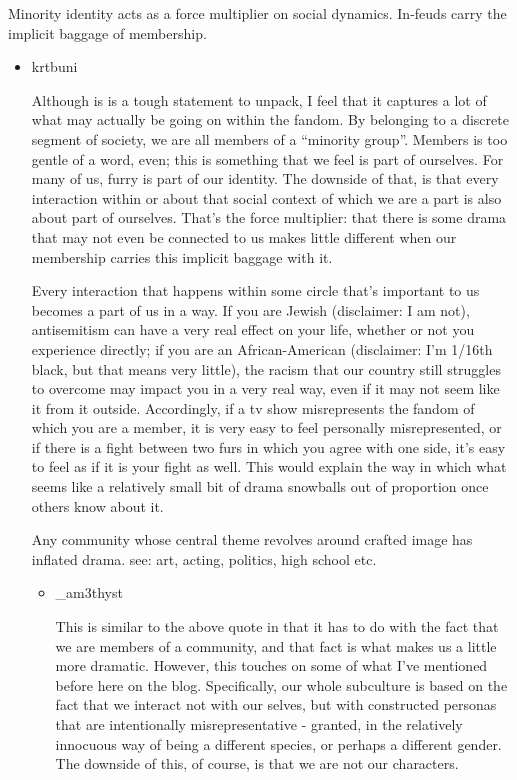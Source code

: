 Minority identity acts as a force multiplier on social dynamics. In-feuds carry the implicit baggage of membership.

\begin{itemize}
\tightlist
\item
  krtbuni

  Although is is a tough statement to unpack, I feel that it captures a lot of what may actually be going on within the fandom. By belonging to a discrete segment of society, we are all members of a ``minority group''. Members is too gentle of a word, even; this is something that we feel is part of ourselves. For many of us, furry is part of our identity. The downside of that, is that every interaction within or about that social context of which we are a part is also about part of ourselves. That's the force multiplier: that there is some drama that may not even be connected to us makes little different when our membership carries this implicit baggage with it.

  Every interaction that happens within some circle that's important to us becomes a part of us in a way. If you are Jewish (disclaimer: I am not), antisemitism can have a very real effect on your life, whether or not you experience directly; if you are an African-American (disclaimer: I'm 1/16th black, but that means very little), the racism that our country still struggles to overcome may impact you in a very real way, even if it may not seem like it from it outside. Accordingly, if a tv show misrepresents the fandom of which you are a member, it is very easy to feel personally misrepresented, or if there is a fight between two furs in which you agree with one side, it's easy to feel as if it is your fight as well. This would explain the way in which what seems like a relatively small bit of drama snowballs out of proportion once others know about it.

  Any community whose central theme revolves around crafted image has inflated drama. see: art, acting, politics, high school etc.

  \begin{itemize}
  \tightlist
  \item
    \_am3thyst

    This is similar to the above quote in that it has to do with the fact that we are members of a community, and that fact is what makes us a little more dramatic. However, this touches on some of what I've mentioned before here on the blog. Specifically, our whole subculture is based on the fact that we interact not with our selves, but with constructed personas that are intentionally misrepresentative - granted, in the relatively innocuous way of being a different species, or perhaps a different gender. The downside of this, of course, is that we are not our characters.


\end{itemize}
\end{itemize}

